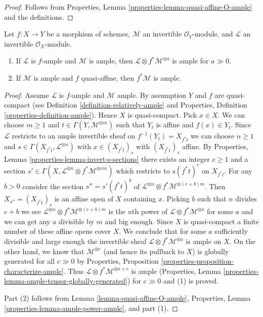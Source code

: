 \begin{proof}
Follows from Properties, Lemma \ref{properties-lemma-quasi-affine-O-ample}
and the definitions.
\end{proof}

\begin{lemma}
\label{lemma-pullback-ample-tensor-relatively-ample}
Let $f : X \to Y$ be a morphism of schemes, $\mathcal{M}$
an invertible $\mathcal{O}_Y$-module, and $\mathcal{L}$ an
invertible $\mathcal{O}_X$-module.
\begin{enumerate}
\item If $\mathcal{L}$ is $f$-ample and $\mathcal{M}$
is ample, then $\mathcal{L} \otimes f^*\mathcal{M}^{\otimes a}$ is ample
for $a \gg 0$.
\item If $\mathcal{M}$ is ample
and $f$ quasi-affine, then $f^*\mathcal{M}$ is ample.
\end{enumerate}
\end{lemma}

\begin{proof}
Assume $\mathcal{L}$ is $f$-ample and $\mathcal{M}$ ample.
By assumption $Y$ and $f$ are quasi-compact (see
Definition \ref{definition-relatively-ample} and
Properties, Definition \ref{properties-definition-ample}).
Hence $X$ is quasi-compact. Pick $x \in X$. We can choose $m \geq 1$
and $t \in \Gamma(Y, \mathcal{M}^{\otimes m})$ such that $Y_t$
is affine and $f(x) \in Y_t$. Since $\mathcal{L}$ restricts to an
ample invertible sheaf on $f^{-1}(Y_t) = X_{f^*t}$
we can choose $n \geq 1$ and $s \in \Gamma(X_{f^*t}, \mathcal{L}^{\otimes n})$
with $x \in (X_{f^*t})_s$ with $(X_{f^*t})_s$ affine.
By Properties, Lemma \ref{properties-lemma-invert-s-sections}
there exists an integer $e \geq 1$ and a section
$s' \in \Gamma(X, \mathcal{L}^{\otimes n} \otimes f^*\mathcal{M}^{\otimes em})$
which restricts to $s(f^*t)^e$ on $X_{f^*t}$. For any $b > 0$
consider the section $s'' = s'(f^*t)^b$ of
$\mathcal{L}^{\otimes n} \otimes f^*\mathcal{M}^{\otimes (e + b)m}$.
Then $X_{s''} = (X_{f^*t})_s$ is an affine open of $X$ containing $x$.
Picking $b$ such that $n$ divides $e + b$ we see
$\mathcal{L}^{\otimes n} \otimes f^*\mathcal{M}^{\otimes (e + b)m}$
is the $n$th power of $\mathcal{L} \otimes f^*\mathcal{M}^{\otimes a}$
for some $a$ and we can get any $a$ divisible by $m$ and big enough.
Since $X$ is quasi-compact a finite number of these affine opens
cover $X$. We conclude that for some $a$ sufficiently divisible and
large enough the invertible sheaf
$\mathcal{L} \otimes f^*\mathcal{M}^{\otimes a}$ is ample on $X$.
On the other hand, we know that $\mathcal{M}^{\otimes c}$
(and hence its pullback to $X$) is globally generated for all $c \gg 0$
by Properties, Proposition \ref{properties-proposition-characterize-ample}.
Thus $\mathcal{L} \otimes f^*\mathcal{M}^{\otimes a + c}$ is ample
(Properties, Lemma \ref{properties-lemma-ample-tensor-globally-generated})
for $c \gg 0$ and (1) is proved.

\medskip\noindent
Part (2) follows from Lemma \ref{lemma-quasi-affine-O-ample},
Properties, Lemma \ref{properties-lemma-ample-power-ample}, and
part (1).
\end{proof}

